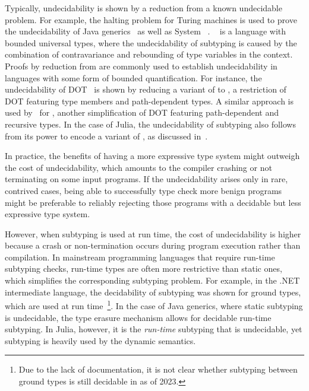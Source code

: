 Typically, undecidability is shown by a reduction from a known undecidable
problem. For example, the halting problem for Turing machines is used
to prove the undecidability of Java generics~\cite{bib:grigore:java-undec:2017}
as well as System \FSub~\cite{bib:pierce:bound-sub-undec:1992}.
\FSub~\cite{bib:cardelli:fsub:1991} is a language with bounded universal types,
where the undecidability of subtyping is caused by the combination of
contravariance and rebounding of type variables in the context.
Proofs by reduction from \FSub are commonly used to establish
undecidability in languages with some form of bounded quantification.
For instance, the undecidability of DOT~\cite{bib:hu:dot-undec:2020} is shown
by reducing a variant of \FSub to \DSub, a restriction of DOT featuring type
members and path-dependent types. A similar approach is used
by~\citet{bib:mackay:path-dep-dec:2020} for \WyvCore, another simplification of
DOT featuring path-dependent and recursive types.
In the case of Julia, the undecidability of subtyping also follows from its
power to encode a variant of \FSub,
as discussed in~.

In practice, the benefits of having a more expressive type system might outweigh
the cost of undecidability, which amounts to the compiler crashing or
not terminating on some input programs.
If the undecidability arises only in rare, contrived cases,
being able to successfully type check more benign programs
might be preferable to reliably rejecting those
programs with a decidable but less expressive type system.

However, when subtyping is used at run time, the cost of undecidability is
higher because a crash or non-termination occurs during program execution
rather than compilation.
In mainstream programming languages that require run-time subtyping checks,
run-time types are often more restrictive than static ones,
which simplifies the corresponding subtyping problem.
For example, in the .NET intermediate language,
the decidability of subtyping was shown for ground types,
which are used at run time~\cite{bib:kennedy:nom-sub-var-dec:2007}\footnote{Due
to the lack of documentation, it is not clear whether subtyping between ground
types is still decidable in \CSharp as of 2023.}.
In the case of Java generics, where static subtyping is undecidable,
the type erasure mechanism allows for decidable run-time subtyping.
In Julia, however, it is the \emph{run-time} subtyping that is undecidable,
yet subtyping is heavily used by the dynamic semantics.

